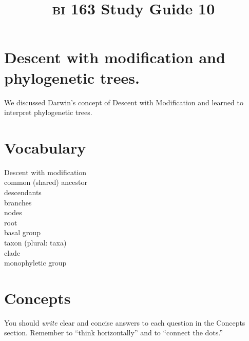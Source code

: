 \documentclass[letterpaper]{tufte-handout}
\title{{\scshape bi} 163 Study Guide 10}
\date{} %
\begin{document}
\maketitle	%

\section*{Descent with modification and phylogenetic trees.}

We discussed Darwin's concept of Descent with Modification and learned to interpret phylogenetic trees.

\section*{Vocabulary}

\vspace{-1\baselineskip}
\begin{multicols}{2}
Descent with modification\\
common (shared) ancestor \\
descendants \\
branches \\
nodes \\
root \\
basal group \\
taxon (plural: taxa) \\
clade \\
monophyletic group \\

\end{multicols}

\section*{Concepts}

You should \emph{write} clear and concise answers to each question in the Concepts section.  Remember to ``think horizontally'' and to ``connect the dots.'' 
\end{document}
